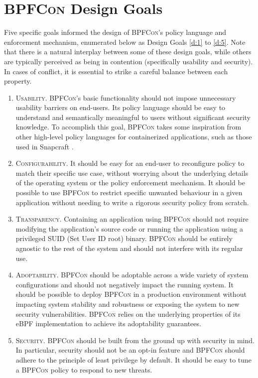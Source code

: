 \documentclass[dvipsnames, 12pt]{article}
\def\bpfcon{\textsc{BPFCon}}
\begin{document}
\section{\bpfcon{} Design Goals}
\label{sec:design}

Five specific goals informed the design of \bpfcon{}'s policy language and
enforcement mechanism, enumerated below as Design Goals \ref{d:1} to \ref{d:5}.
Note that there is a natural interplay between some of these design goals, while
others are typically perceived as being in contention (specifically usability
and security). In cases of conflict, it is essential to strike a careful balance
between each property.

\begin{enumerate}[label=\bfseries D\arabic*., ref=D\arabic*]
  \item \label{d:1} \textsc{Usability.}
    \bpfcon{}'s basic functionality should not impose unnecessary usability
    barriers on end-users.  Its policy language should be easy to understand and
    semantically meaningful to users without significant security knowledge. To
    accomplish this goal, \bpfcon{} takes some inspiration from other high-level
    policy languages for containerized applications, such as those used in
    Snapcraft \cite{snap}.

  \item \label{d:2} \textsc{Configurability.}
    It should be easy for an end-user to reconfigure policy to match their
    specific use case, without worrying about the underlying details of the
    operating system or the policy enforcement mechanism. It should be possible
    to use \bpfcon{} to restrict specific unwanted behaviour in a given
    application without needing to write a rigorous security policy from
    scratch.

  \item \label{d:3} \textsc{Transparency.}
    Containing an application using \bpfcon{} should not require modifying the
    application's source code or running the application using a privileged SUID
    (Set User ID root) binary. \bpfcon{} should be entirely agnostic to the rest
    of the system and should not interfere with its regular use.

  \item \label{d:4} \textsc{Adoptability.}
    \bpfcon{} should be adoptable across a wide variety of system configurations
    and should not negatively impact the running system. It should be possible
    to deploy \bpfcon{} in a production environment without impacting system
    stability and robustness or exposing the system to new security
    vulnerabilities. \bpfcon{} relies on the underlying properties of its eBPF
    implementation to achieve its adoptability guarantees.

  \item \label{d:5} \textsc{Security.}
    \bpfcon{} should be built from the ground up with security in mind. In
    particular, security should not be an opt-in feature and \bpfcon{} should
    adhere to the principle of least privilege \cite{saltzer1975_protection} by
    default. It should be easy to tune a \bpfcon{} policy to respond to new
    threats.
\end{enumerate}
\end{document}
